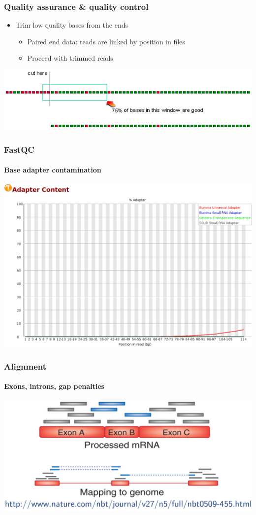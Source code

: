 \documentclass{beamer}			  %
\begin{document}
\begin{frame}
\frametitle{Quality assurance \& quality control}
	\begin{itemize}
		\item Trim low quality bases from the ends
		\begin{itemize}
			\item Paired end data: reads are linked by position in
files
			\item Proceed with trimmed reads
		\end{itemize}
	\end{itemize}
	\begin{center}
		\includegraphics[width=\textwidth]{figures/dge_03dp.png}
	\end{center}
\end{frame}


\begin{frame}
\frametitle{FastQC}
\framesubtitle{Base adapter contamination}
	\begin{center}
		\includegraphics[height=0.75\textheight]{figures/dge_04p.png}
	\end{center}
\end{frame}

\begin{frame}
\frametitle{Alignment}
\framesubtitle{Exons, introns, gap penalties}
	\begin{center}
		\includegraphics[width=\textwidth]{figures/dge_05p.png}
	\end{center}
\end{frame}
\end{document}
